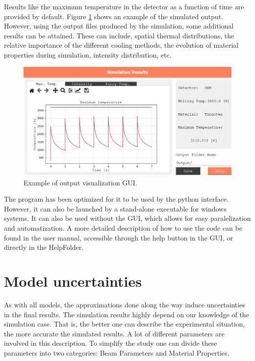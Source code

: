 Results like the maximum temperature in the detector as a function of time are provided by default. Figure \ref{fig:GUIResults} shows an example of the simulated output. However, using the output files produced by the simulation, some additional results can be attained. These can include, spatial thermal distributions, the relative importance of the different cooling methods, the evolution of material properties during simulation, intensity distribution, etc. 

\begin{figure}[h]
    \centering
    \includegraphics[width=0.9\columnwidth]{PyTT_GUI/PyTTresults.png}
    \caption{Example of output visualization GUI.}
    \label{fig:GUIResults}
\end{figure}

The program has been optimized for it to be used by the python interface. However, it can also be launched by a stand-alone executable for windows systems. It can also be used without the GUI, which allows for easy paralelization and automatization. A more detailed description of how to use the code can be found in the user manual, accessible through the help button in the GUI, or directly in the HelpFolder.

\section{Model uncertainties}
\label{sec:ModelUnc}

As with all models, the approximations done along the way induce uncertainties in the final results. The simulation results highly depend on our knowledge of the simulation case. That is, the better one can describe the experimental situation, the more accurate the simulated results. A lot of different parameters are involved in this description. To simplify the study one can divide these parameters into two categories: Beam Parameters and Material Properties. 

